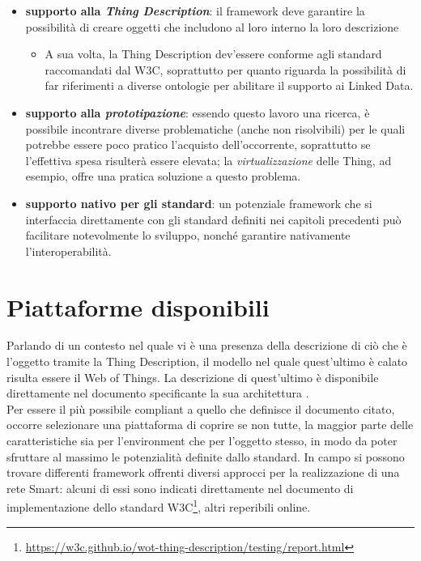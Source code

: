 \documentclass[12pt,a4paper,openright,oneside]{report}
\begin{document}
\begin{itemize}
	\setlength\itemsep{0em}
	\item \textbf{supporto alla \textit{Thing Description}}: il framework deve garantire la possibilità di creare oggetti che includono al loro interno la loro descrizione
	\begin{itemize}
		\setlength\itemsep{0em}
		\item A sua volta, la Thing Description dev'essere conforme agli standard raccomandati dal W3C, soprattutto per quanto riguarda la possibilità di far riferimenti a diverse ontologie per abilitare il supporto ai Linked Data.
	\end{itemize}

	\item \textbf{supporto alla \textit{prototipazione}}: essendo questo lavoro una ricerca, è possibile incontrare diverse problematiche (anche non risolvibili) per le quali potrebbe essere poco pratico l'acquisto dell'occorrente, soprattutto se l'effettiva spesa risulterà essere elevata; la \textit{virtualizzazione} delle Thing, ad esempio, offre una pratica soluzione a questo problema.
	
	\item \textbf{supporto nativo per gli standard}: un potenziale framework che si interfaccia direttamente con gli standard definiti nei capitoli precedenti può facilitare notevolmente lo sviluppo, nonché garantire nativamente l'interoperabilità.
\end{itemize}

\section{Piattaforme disponibili}
Parlando di un contesto nel quale vi è una presenza della descrizione di ciò che è l'oggetto tramite la Thing Description, il modello nel quale quest'ultimo è calato risulta essere il Web of Things. La descrizione di quest'ultimo è disponibile direttamente nel documento specificante la sua architettura \cite{wot}.\\

Per essere il più possibile compliant a quello che definisce il documento citato, occorre selezionare una piattaforma di coprire se non tutte, la maggior parte delle caratteristiche sia per l'environment che per l'oggetto stesso, in modo da poter sfruttare al massimo le potenzialità definite dallo standard. In campo si possono trovare differenti framework offrenti diversi approcci per la realizzazione di una rete Smart: alcuni di essi sono indicati direttamente nel documento di implementazione dello standard W3C\footnote{\url{https://w3c.github.io/wot-thing-description/testing/report.html}}, altri reperibili online.
\end{document}
